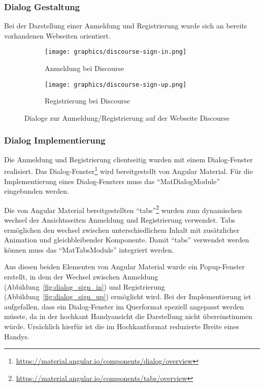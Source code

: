 \subsubsection{Dialog Gestaltung}
Bei der Darstellung einer Anmeldung und Registrierung wurde sich an bereits vorhandenen Webseiten orientiert. 

\begin{figure}[h]
	\centering
	\begin{subfigure}{.5\textwidth}
		\texttt{[image: graphics/discourse-sign-in.png]}
		\caption{Anmeldung bei Discourse}
		\label{fig:discourse-sign-in}
	\end{subfigure}%
	\begin{subfigure}{.5\textwidth}
		\centering
		\texttt{[image: graphics/discourse-sign-up.png]}
		\caption{Registrierung bei Discourse}
		\label{fig:discourse-sign-up}
	\end{subfigure}
	\caption{Dialoge zur Anmeldung/Registrierung auf der Webseite Discourse}
	\label{fig:discourse}
\end{figure}

\subsubsection{Dialog Implementierung}
\label{sec:client-dialog-authentication}
Die Anmeldung und Registrierung clientseitig wurden mit einem Dialog-Fenster realisiert. Das Dialog-Fenster\footnote{\url{https://material.angular.io/components/dialog/overview}} wird bereitgestellt von Angular Material. Für die Implementierung eines Dialog-Fensters muss das \enquote{MatDialogModule} eingebunden werden. 

Die von Angular Material bereitgestellten \enquote{tabs}\footnote{\url{https://material.angular.io/components/tabs/overview}} wurden zum dynamischen wechsel der Ansichtsseiten Anmeldung und Registrierung verwendet. Tabs ermöglichen den wechsel zwischen unterschiedlichem Inhalt mit zusätzlicher Animation und gleichbleibender Komponente. Damit \enquote{tabs} verwendet werden können muss das \enquote{MatTabsModule} integriert werden.

Aus diesen beiden Elementen von Angular Material wurde ein Popup-Fenster erstellt, in dem der Wechsel zwischen Anmeldung (Abbildung~\ref{fig:dialog_sign_in}) und Registrierung (Abbildung~\ref{fig:dialog_sign_up}) ermöglicht wird. Bei der Implementierung ist aufgefallen, dass ein Dialog-Fenster im Querformat speziell angepasst werden müsste, da in der hochkant Handyansicht die Darstellung nicht übereinstimmen würde. Ursächlich hierfür ist die im Hochkantformat reduzierte Breite eines Handys.

